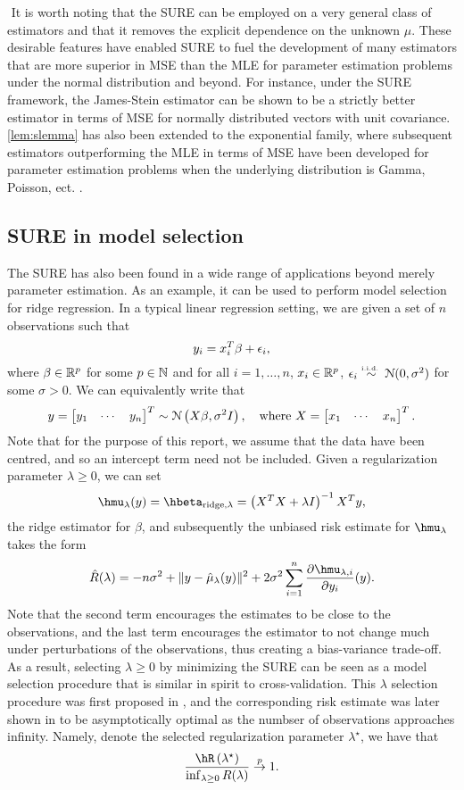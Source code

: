 $ $\newline
It is worth noting that the SURE can be employed on a very general class of estimators and that it removes the explicit dependence on the unknown $\mu$. These desirable features have enabled SURE to fuel the development of many estimators that are more superior in MSE than the MLE for parameter estimation problems under the normal distribution and beyond. For instance, under the SURE framework, the James-Stein estimator \citep{james1992estimation} can be shown to be a strictly better estimator in terms of MSE for normally distributed vectors with unit covariance. \cref{lem:slemma} has also been extended to the exponential family, where subsequent estimators outperforming the MLE in terms of MSE have been developed for parameter estimation problems when the underlying distribution is Gamma, Poisson, ect. \citep{hudson1978natural,peng1975simultaneous,tsui1978simultaneous}.

\subsection{SURE in model selection}\label{sec:sure_model_selection}
The SURE has also been found in a wide range of applications beyond merely parameter estimation. As an example, it can be used to perform model selection for ridge regression. In a typical linear regression setting, we are given a set of $n$ observations such that
\[
y_i = x_i^T\beta + \epsilon_i,
\]
where $\beta\in\mathbb{R}^p$ for some $p\in\mathbb{N}$ and for all $i=1,\dots,n$, $x_i\in\mathbb{R}^p$, $\epsilon_i\overset{\textrm{\tiny i.i.d.\ }}{\sim} \mathcal{N}(0,\sigma^2)$ for some $\sigma>0$. We can equivalently write that
\[
y = \begin{bmatrix} y_1 & \cdots & y_n \end{bmatrix}^T \sim \mathcal{N}\left(X\beta, \sigma^2I \right), \quad \text{where } X = \begin{bmatrix} x_1 & \cdots & x_n \end{bmatrix}^T.
\]
Note that for the purpose of this report, we assume that the data have been centred, and so an intercept term need not be included. Given a regularization parameter $\lambda\geq0$, we can set
\[
\hmu_\lambda(y) = \hbeta_{\text{ridge}, \lambda} = \left( X^TX + \lambda I \right)^{-1}X^Ty,
\]
the ridge estimator for $\beta$, and subsequently the unbiased risk estimate for $\hmu_\lambda$ takes the form
\[
\hat{R}(\lambda) = -n\sigma^2 + \| y - \hat{\mu}_\lambda(y) \|^2 + 2\sigma^2\sum_{i=1}^n \frac{\partial \hmu_{\lambda,i}}{\partial y_i}(y).
\]
Note that the second term encourages the estimates to be close to the observations, and the last term encourages the estimator to not change much under perturbations of the observations, thus creating a bias-variance trade-off. As a result, selecting $\lambda\geq0$ by minimizing the SURE can be seen as a model selection procedure that is similar in spirit to cross-validation. This $\lambda$ selection procedure was first proposed in \citet{10.2307/1267380}, and the corresponding risk estimate was later shown in \citet{li1986asymptotic} to be asymptotically optimal as the numbser of observations approaches infinity. Namely, denote the selected regularization parameter $\lambda^\star$, we have that
\[
\frac{\hR\left(\lambda^\star\right)}{\inf_{\lambda\geq0}R(\lambda)} \convp 1.
\]
